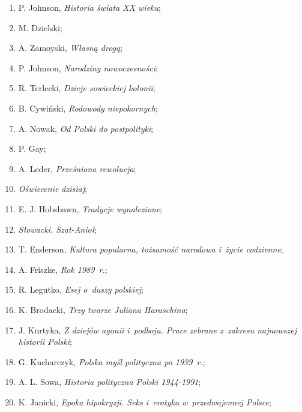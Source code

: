 \documentclass[a4paper,11pt]{article}
\begin{document}
\begin{enumerate}
\item P. Johnson, \emph{Historia świata XX wieku};

\item M. Dzielski;

\item A. Zamoyski, \emph{Własną drogą};

\item P. Johnson, \emph{Narodziny nowoczesności};

\item R. Terlecki, \emph{Dzieje sowieckiej kolonii};

\item B. Cywiński, \emph{Rodowody niepokornych};

\item A. Nowak, \emph{Od Polski do postpolityki};

\item P. Gay;

\item A. Leder, \emph{Prześniona rewolucja};

\item \emph{Oświecenie dzisiaj};

\item E. J. Hobsbawn, \emph{Tradycje wynalezione};

\item \emph{Słowacki. Szat-Anioł};

\item T. Enderson, \emph{Kultura popularna, tożsamość narodowa i~życie
    codzienne};

\item A. Friszke, \emph{Rok 1989~r.};

\item R. Legutko, \emph{Esej o~duszy polskiej};

\item K. Brodacki, \emph{Trzy twarze Juliana Haraschina};

\item J. Kurtyka, \emph{Z dziejów agonii i~podboju. Prace zebrane
    z~zakresu najnowszej historii Polski};

\item G. Kucharczyk, \emph{Polska myśl polityczna po 1939~r.};

\item A. L. Sowa, \emph{Historia polityczna Polski 1944-1991};

\item K. Janicki, \emph{Epoka hipokryzji. Seks i~erotyka
    w~przedwojennej Polsce};


\end{enumerate}
\end{document}
